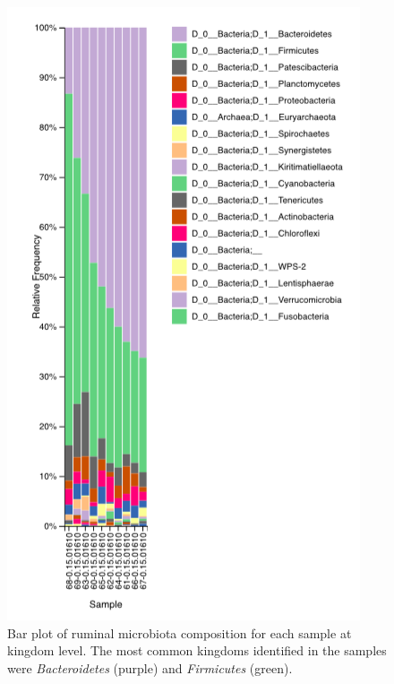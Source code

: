 \documentclass{singlecol-new}
\theoremstyle{TH}{
\newtheorem{lemma}{Lemma}
\newtheorem{theorem}[lemma]{Theorem}
\newtheorem{corrolary}[lemma]{Corrolary}
\newtheorem{conjecture}[lemma]{Conjecture}
\newtheorem{proposition}[lemma]{Proposition}
\newtheorem{claim}[lemma]{Claim}
\newtheorem{stheorem}[lemma]{Wrong Theorem}
\newtheorem{algorithm}{Algorithm}
}
\theoremstyle{THrm}{
\newtheorem{definition}{Definition}[section]
\newtheorem{question}{Question}[section]
\newtheorem{remark}{Remark}
\newtheorem{scheme}{Scheme}
}
\theoremstyle{THhit}{
\newtheorem{case}{Case}[section]
}
\begin{document}
\begin{figure}[htbp]
\centerline{\includegraphics[scale=0.45]{figures/kingdom-bp.png}}
\caption{Bar plot of ruminal microbiota composition for each sample at kingdom level. The most common kingdoms identified in the samples were \textit{Bacteroidetes} (purple) and \textit{Firmicutes} (green).}
\label{fig. 4}
\end{figure}
\end{document}
